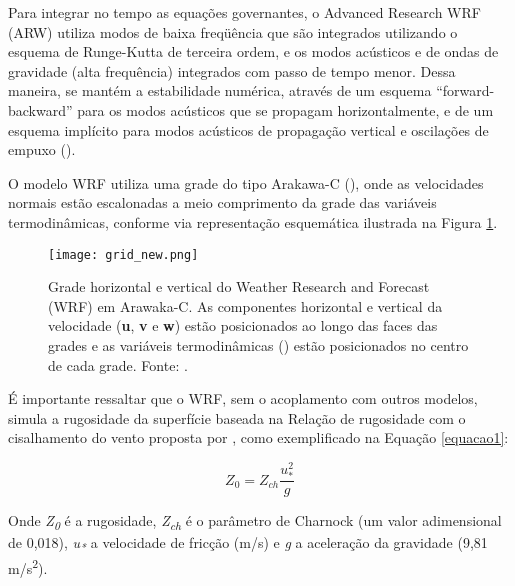 \noindent Para integrar no tempo as equações governantes, o Advanced Research WRF (ARW) utiliza modos de baixa freqüência que são integrados 
          utilizando o esquema de Runge-Kutta de terceira ordem, e os modos acústicos e de ondas de gravidade (alta frequência) integrados 
          com passo de tempo menor. Dessa maneira, se mantém a estabilidade numérica, através de um esquema “forward-backward” para 
          os modos acústicos que se propagam horizontalmente, e de um esquema implícito para modos acústicos de propagação 
          vertical e oscilações de empuxo (\cite{Skamarock2008}).
\bigskip

\noindent O modelo WRF utiliza uma grade do tipo Arakawa-C (\cite{Arakawa1977}), onde as velocidades normais estão
          escalonadas a meio comprimento da grade das variáveis termodinâmicas, conforme via representação esquemática ilustrada
          na Figura \textcolor{bleu_cite}{\ref{gradeswrf}}.
\bigskip

\begin{figure}[H]
    \centering
    \captionsetup{justification=centering}
    \texttt{[image: grid\_new.png]}
    \caption{Grade horizontal e vertical do Weather Research and Forecast (WRF) em Arawaka-C. As componentes horizontal e vertical
                        da velocidade (\textbf{u}, \textbf{v} e \textbf{w}) estão posicionados ao longo das faces das grades e as variáveis termodinâmicas
                        (\straighttheta) estão posicionados no centro de cada grade. \newline Fonte: \textcite{Skamarock2008}.}
    \label{gradeswrf}
\end{figure}
\bigskip

\noindent É importante ressaltar que o WRF, sem o acoplamento com outros modelos, simula a rugosidade da superfície 
          baseada na Relação de rugosidade com o cisalhamento do vento proposta por \textcite{Charnock1955},
          como exemplificado na Equação \textcolor{bleu_cite}{\ref{equacao1}}:
\bigskip

\begin{equation}
Z_{0} = Z_{ch} \frac{u_{*}^{2}}{g}
\label{equacao1}
\end{equation}

\bigskip

\noindent Onde \textit{Z\textsubscript{0}} é a rugosidade, \textit{Z\textsubscript{ch}} é o parâmetro de Charnock 
         (um valor adimensional de 0,018), \textit{u\textsubscript{*}} a velocidade de fricção (m/s) e \textit{g} a 
         aceleração da gravidade (9,81 m/s\textsuperscript{2}).
\bigskip

